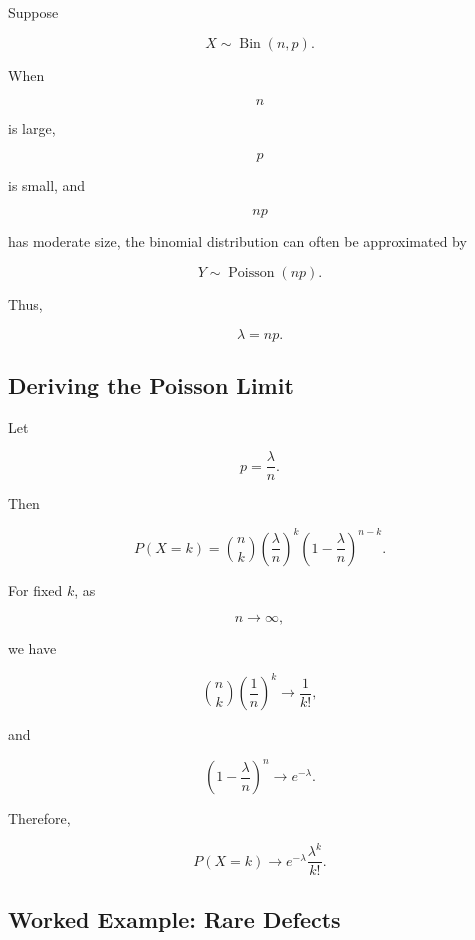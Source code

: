 Suppose

\[
X\sim\operatorname{Bin}(n,p).
\]

When

\[
n
\]

is large,

\[
p
\]

is small, and

\[
np
\]

has moderate size, the binomial distribution can often be approximated
by

\[
\boxed{
Y\sim\operatorname{Poisson}(np).
}
\]

Thus,

\[
\boxed{
\lambda=np.
}
\]

\subsection{Deriving the Poisson Limit}
\label{subsec:derive-poisson-limit}

Let

\[
p=\frac{\lambda}{n}.
\]

Then

\[
P(X=k)
=
\binom nk
\left(\frac{\lambda}{n}\right)^k
\left(1-\frac{\lambda}{n}\right)^{n-k}.
\]

For fixed \(k\), as

\[
n\to\infty,
\]

we have

\[
\binom nk
\left(\frac1n\right)^k
\to
\frac1{k!},
\]

and

\[
\left(1-\frac{\lambda}{n}\right)^n
\to
e^{-\lambda}.
\]

Therefore,

\[
\boxed{
P(X=k)
\to
e^{-\lambda}
\frac{\lambda^k}{k!}.
}
\]

\subsection{Worked Example: Rare Defects}
\label{subsec:worked-poisson-approx-binomial}

